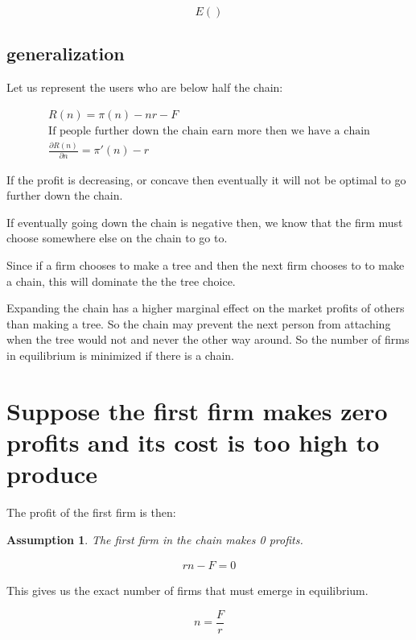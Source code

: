 \documentclass{article}
\newtheorem{assumption}{Assumption}
\begin{document}
\begin{equation*}
E()
\end{equation*}


\subsection{generalization}

Let us represent the users who are below half the chain:

\begin{align*}
R(n) = \pi(n)-nr-F \\
\text{If people further down the chain earn more then we have a chain} \\
\frac{\partial R(n)}{\partial n} = \pi'(n)-r  
\end{align*}

If the profit is decreasing, or concave then eventually it will not be optimal to go further down the chain. 

If eventually going down the chain is negative then, we know that the firm must choose somewhere else on the chain to go to. 

Since if a firm chooses to make a tree and then the next firm chooses to to make a chain, this will dominate the the tree choice. 

Expanding the chain has a higher marginal effect on the market profits of others than making a tree. So the chain may prevent the next person from attaching when the tree would not and never the other way around. So the number of firms in equilibrium is minimized if there is a chain. 

\section{Suppose the first firm makes zero profits and its cost is too high to produce}

The profit of the first firm is then:

\begin{assumption}
The first firm in the chain makes 0 profits. 
\end{assumption}

\begin{align*}
rn-F=0
\end{align*}

This gives us the exact number of firms that must emerge in equilibrium. 

\begin{equation*}
n = \frac{F}{r}
\end{equation*}
\end{document}
